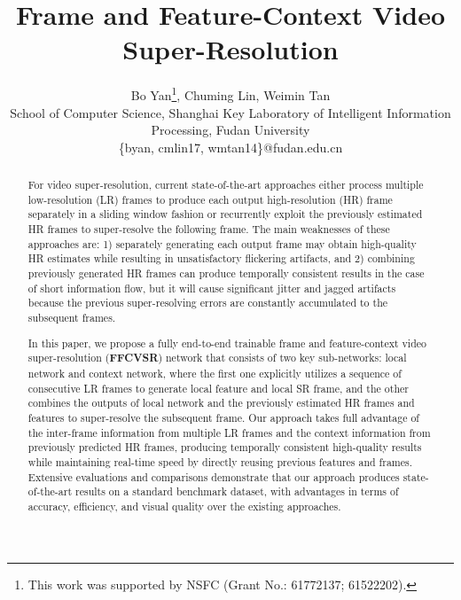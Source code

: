 \documentclass[letterpaper]{article} %
\begin{document}
%
\title{Frame and Feature-Context Video Super-Resolution}
\author{Bo Yan\thanks{This work was supported by NSFC (Grant No.: 61772137; 61522202).}, Chuming Lin, Weimin Tan\\
School of Computer Science, Shanghai Key Laboratory of Intelligent Information Processing, Fudan University\\
\{byan, cmlin17, wmtan14\}@fudan.edu.cn\\
}
\maketitle
\begin{abstract}
For video super-resolution, current state-of-the-art approaches either process multiple low-resolution (LR) frames to produce each output high-resolution (HR) frame separately in a sliding window fashion or recurrently exploit the previously estimated HR frames to super-resolve the following frame. The main weaknesses of these approaches are: 1) separately generating each output frame may obtain high-quality HR estimates while resulting in unsatisfactory flickering artifacts, and 2) combining previously generated HR frames can produce temporally consistent results in the case of short information flow, but it will cause significant jitter and jagged artifacts because the previous super-resolving errors are constantly accumulated to the subsequent frames.

In this paper, we propose a fully end-to-end trainable frame and feature-context video super-resolution (\textbf{FFCVSR}) network that consists of two key sub-networks: local network and context network, where the first one explicitly utilizes a sequence of consecutive LR frames to generate local feature and local SR frame, and the other combines the outputs of local network and the previously estimated HR frames and features to super-resolve the subsequent frame. Our approach takes full advantage of the inter-frame information from multiple LR frames and the context information from previously predicted HR frames, producing temporally consistent high-quality results while maintaining real-time speed by directly reusing previous features and frames. Extensive evaluations and comparisons demonstrate that our approach produces state-of-the-art results on a standard benchmark dataset, with advantages in terms of accuracy, efficiency, and visual quality over the existing approaches.
\end{abstract}
\end{document}
